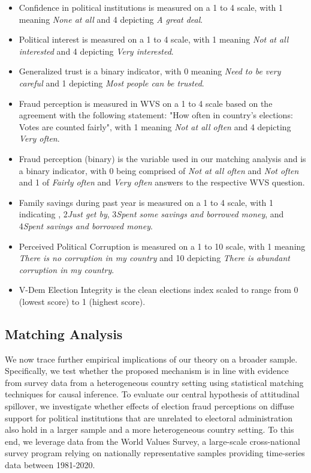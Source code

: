 \documentclass[11pt, ngerman,english,a4]{article}
\begin{document}
\begin{itemize}
    \item Confidence in political institutions is measured on a 1 to 4 scale, with 1 meaning \textit{None at all} and 4 depicting \textit{A great deal}.
    \item Political interest is measured on a 1 to 4 scale, with 1 meaning \textit{Not at all interested} and 4 depicting \textit{Very interested}.
    \item Generalized trust is a binary indicator, with 0 meaning \textit{Need to be very careful} and 1 depicting \textit{Most people can be trusted}.
    \item Fraud perception is measured in WVS on a 1 to 4 scale based on the agreement with the following statement: "How often in country's elections: Votes are counted fairly", with 1 meaning \textit{Not at all often} and 4 depicting \textit{Very often}. 
    \item Fraud perception (binary) is the variable used in our matching analysis and is a binary indicator, with 0 being comprised of \textit{Not at all often} and \textit{Not often} and 1 of \textit{Fairly often} and \textit{Very often} answers to the respective WVS question. 
    \item Family savings during past year is measured on a 1 to 4 scale, with 1 indicating , 2\textemdash\textit{Just get by}, 3\textemdash\textit{Spent some savings and borrowed money}, and 4\textemdash\textit{Spent savings and borrowed money}.  
    \item Perceived Political Corruption is measured on a 1 to 10 scale, with 1 meaning \textit{There is no corruption in my country} and 10 depicting \textit{There is abundant corruption in my country}.
    \item V-Dem Election Integrity is the clean elections index scaled to range from 0 (lowest score) to 1 (highest score).

\end{itemize}

\subsection*{Matching Analysis}
We now trace further empirical implications of our theory on a broader sample. Specifically, we test whether the proposed mechanism is in line with evidence from survey data from a heterogeneous country setting using statistical matching techniques for causal inference. To evaluate our central hypothesis of attitudinal spillover, we investigate whether effects of election fraud perceptions on diffuse support for political institutions that are unrelated to electoral administration also hold in a larger sample and a more heterogeneous country setting. To this end, we leverage data from the World Values Survey, a large-scale cross-national survey program relying on nationally representative samples providing time-series data between 1981-2020. 
\end{document}
